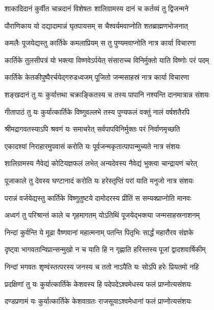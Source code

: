 \twolineshloka
{शाकादिदानं कुर्वीत चान्नदानं विशेषतः}
{शालिग्रामस्य दानं च कर्तव्यं तु द्विजन्मने} %

\twolineshloka
{पौराणिकाय यो दद्यादामान्नं घृतपायसम्}
{स चैश्वर्यमवाप्नोति शतब्राह्मणभोजनात्} %

\twolineshloka
{कमलैः पूजयेद्यस्तु कार्तिके कमलाप्रियम्}
{स तु पुण्यमवाप्नोति नात्र कार्या विचारणा} %

\twolineshloka
{कार्तिके तुलसीपत्रं यो भक्त्या विष्णवेऽर्पयेत्}
{संसाराच्च विनिर्मुक्तो याति विष्णोः परं पदम्} %

\twolineshloka
{कार्तिके केतकीपुष्पैरर्चयेद्गरुडध्वजम्}
{पूजितो जन्मसाहस्रं नात्र कार्या विचारणा} %

\twolineshloka
{शङ्खदानं तु यः कुर्यात्तथा चक्राङ्कितस्य च}
{तस्य पापानि नश्यन्ति दानमात्रान्न संशयः} %

\twolineshloka
{गीतापाठं तु यः कुर्यात्कार्तिके विष्णुवल्लभे}
{तस्य पुण्यफलं वक्तुं नालं वर्षशतैरपि} %

\twolineshloka
{श्रीमद्रागवतस्याऽपि श्रवणं यः समाचरेत्}
{सर्वपापविनिर्मुक्तः परं निर्वाणमृच्छति} %

\twolineshloka
{एकादश्यां निराहारमुपवासं करोति यः}
{पूर्वजन्मकृतात्पापान्मुच्यते नात्र संशयः} %

\twolineshloka
{शालिग्रामस्य नैवेद्यं कोटियज्ञफलं लभेत्}
{अन्यदेवस्य नैवेद्यं भुक्त्वा चान्द्रायणं चरेत्} %

\twolineshloka
{पूजाकाले तु देवस्य घण्टानादं करोति यः}
{हरेस्तृप्तिं परां याति मनुजो नात्र संशयः} %

\twolineshloka
{परान्नं वर्जयेद्यस्तु कार्तिके विष्णुतुष्टये}
{दामोदरस्य प्रीतिं स सम्यक्प्राप्नोति मानवः} %

\twolineshloka
{अध्वगं तु परिश्रान्तं काले च गृहमागतम्}
{योऽतिथिं पूजयेद्भक्त्या जन्मसाहस्रनाशनम्} %

\twolineshloka
{निन्दां कुर्वन्ति ये मूढा वैष्णवानां महात्मनाम्}
{पतन्ति पितृभिः सार्द्धं महारौरव संज्ञके} %

\twolineshloka
{दृष्ट्वा भागवतान्विप्रान्सन्मुखो न च याति हि}
{न गृह्णाति हरिस्तस्य पूजां द्वादशवार्षिकीम्} %

\twolineshloka
{निन्दां भगवतः शृण्वंस्तत्परस्य जनस्य च}
{ततो नाऽपैति यः सोऽपि हरेः प्रियतमो नहि} %

\twolineshloka
{प्रदक्षिणां तु यः कुर्यात्कार्तिके केशवस्य हि}
{पदेपदेऽश्वमेधस्य फलं प्राप्नोत्यसंशयः} %

\twolineshloka
{दण्डप्रणामं यः कुर्यात्कार्तिके केशवाग्रतः}
{राजसूयाऽश्वमेधानां फलं प्राप्नोत्यसंशयः} %

